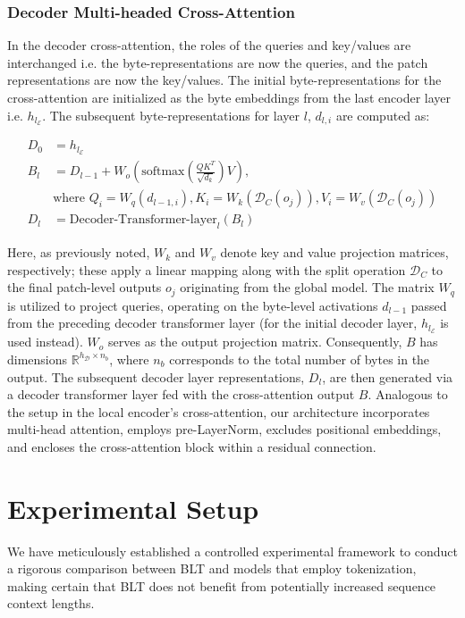 \subsubsection{Decoder Multi-headed Cross-Attention} 

In the decoder cross-attention, the roles of the queries and key/values are interchanged i.e. the byte-representations are now the queries, and the patch representations are now the key/values. The initial byte-representations for the cross-attention are initialized as the byte embeddings from the last encoder layer i.e. $h_{l_{\mathcal{E}}}$. The subsequent byte-representations for layer $l$, $d_{l,i}$ are computed as:

\begin{align}
D_0 &= h_{l_{\mathcal{E}}} \\
B_l &= D_{l-1} + W_o\left(\text{softmax}\left(\frac{QK^T}{\sqrt{d_k}}\right)V\right), \\
  &\text{where } Q_i = W_q(d_{l-1,i}), K_i = W_k(\mathcal{D}_C(o_j)), V_i = W_v(\mathcal{D}_C(o_j)) \\
  D_l &= \text{Decoder-Transformer-layer}_l(B_l)
\end{align}

Here, as previously noted, $W_k$ and $W_v$ denote key and value projection matrices, respectively; these apply a linear mapping along with the split operation $\mathcal{D}_C$ to the final patch-level outputs $o_j$ originating from the global model. The matrix $W_q$ is utilized to project queries, operating on the byte-level activations $d_{l-1}$ passed from the preceding decoder transformer layer (for the initial decoder layer, $h_{l_{\mathcal{E}}}$ is used instead). $W_o$ serves as the output projection matrix. Consequently, $B$ has dimensions $\mathbb{R}^{h_{\mathcal{D}} \times n_b}$, where $n_b$ corresponds to the total number of bytes in the output. The subsequent decoder layer representations, $D_l$, are then generated via a decoder transformer layer fed with the cross-attention output $B$. Analogous to the setup in the local encoder’s cross-attention, our architecture incorporates multi-head attention, employs pre-LayerNorm, excludes positional embeddings, and encloses the cross-attention block within a residual connection.

\section{Experimental Setup}
\label{section:experiments}
We have meticulously established a controlled experimental framework to conduct a rigorous comparison between {\textsc BLT} and models that employ tokenization, making certain that {\textsc BLT} does not benefit from potentially increased sequence context lengths.

